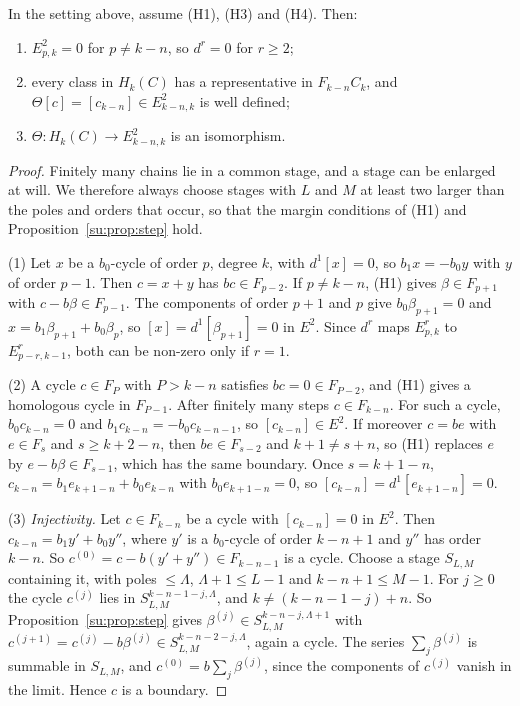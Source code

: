 \begin{theorem}
\label{su:thm:criterion}
In the setting above, assume (H1), (H3) and (H4). Then:
\begin{enumerate}
\item \(E^2_{p,k}=0\) for \(p\ne k-n\), so \(d^r=0\) for \(r\ge2\);
\item every class in \(H_k(C)\) has a representative in \(F_{k-n}C_k\),
and \(\Theta[c]=[c_{k-n}]\in E^2_{k-n,k}\) is well defined;
\item \(\Theta:H_k(C)\to E^2_{k-n,k}\) is an isomorphism.
\end{enumerate}
\end{theorem}

\begin{proof}
Finitely many chains lie in a common stage, and a stage can be enlarged at
will. We therefore always choose stages with \(L\) and \(M\) at least two
larger than the poles and orders that occur, so that the margin
conditions of (H1) and Proposition~\ref{su:prop:step} hold.

(1) Let \(x\) be a \(b_0\)-cycle of order \(p\), degree \(k\), with
\(d^1[x]=0\), so \(b_1x=-b_0y\) with \(y\) of order \(p-1\). Then
\(c=x+y\) has \(bc\in F_{p-2}\). If \(p\ne k-n\), (H1) gives \(\beta\in
F_{p+1}\) with \(c-b\beta\in F_{p-1}\). The components of order \(p+1\)
and \(p\) give \(b_0\beta_{p+1}=0\) and \(x=b_1\beta_{p+1}+b_0\beta_p\),
so \([x]=d^1[\beta_{p+1}]=0\) in \(E^2\). Since \(d^r\) maps
\(E^r_{p,k}\) to \(E^r_{p-r,k-1}\), both can be non-zero only if
\(r=1\).

(2) A cycle \(c\in F_P\) with \(P>k-n\) satisfies \(bc=0\in F_{P-2}\),
and (H1) gives a homologous cycle in \(F_{P-1}\). After finitely many
steps \(c\in F_{k-n}\). For such a cycle, \(b_0c_{k-n}=0\) and
\(b_1c_{k-n}=-b_0c_{k-n-1}\), so \([c_{k-n}]\in E^2\). If moreover
\(c=be\) with \(e\in F_s\) and \(s\ge k+2-n\), then \(be\in F_{s-2}\) and
\(k+1\ne s+n\), so (H1) replaces \(e\) by \(e-b\beta\in F_{s-1}\), which
has the same boundary. Once \(s=k+1-n\), \(c_{k-n}=b_1e_{k+1-n}+
b_0e_{k-n}\) with \(b_0e_{k+1-n}=0\), so \([c_{k-n}]=d^1[e_{k+1-n}]=0\).

(3) \emph{Injectivity.} Let \(c\in F_{k-n}\) be a cycle with
\([c_{k-n}]=0\) in \(E^2\). Then \(c_{k-n}=b_1y'+b_0y''\), where \(y'\) is
a \(b_0\)-cycle of order \(k-n+1\) and \(y''\) has order \(k-n\). So
\(c^{(0)}=c-b(y'+y'')\in F_{k-n-1}\) is a cycle. Choose a stage
\(S_{L,M}\) containing it, with poles \(\le\Lambda\), \(\Lambda+1\le L-1\)
and \(k-n+1\le M-1\). For \(j\ge0\) the cycle \(c^{(j)}\) lies in
\(S^{k-n-1-j,\Lambda}_{L,M}\), and \(k\ne(k-n-1-j)+n\). So
Proposition~\ref{su:prop:step} gives \(\beta^{(j)}\in
S^{k-n-j,\Lambda+1}_{L,M}\) with \(c^{(j+1)}=c^{(j)}-b\beta^{(j)}\in
S^{k-n-2-j,\Lambda}_{L,M}\), again a cycle. The series
\(\sum_j\beta^{(j)}\) is summable in \(S_{L,M}\), and
\(c^{(0)}=b\sum_j\beta^{(j)}\), since the components of \(c^{(j)}\)
vanish in the limit. Hence \(c\) is a boundary.


\end{proof}
